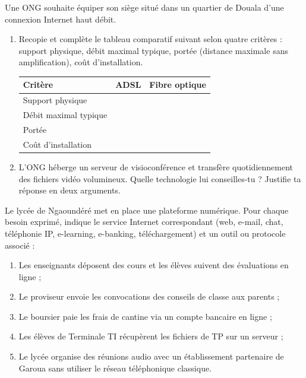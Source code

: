 \documentclass[11pt]{article}
\begin{document}
\begin{exercice}
Une ONG souhaite équiper son siège situé dans un quartier de Douala d'une connexion Internet haut débit.
\begin{enumerate}
    \item Recopie et complète le tableau comparatif suivant selon quatre critères : support physique, débit maximal typique, portée (distance maximale sans amplification), coût d'installation.
\begin{center}
\begin{tabularx}{\linewidth}{|l|X|X|}
\hline
\rowcolor{popblueL} \textbf{Critère} & \textbf{ADSL} & \textbf{Fibre optique} \\
\hline
Support physique & & \\
\hline
Débit maximal typique & & \\
\hline
Portée & & \\
\hline
Coût d'installation & & \\
\hline
\end{tabularx}
\end{center}
    \item L'ONG héberge un serveur de visioconférence et transfère quotidiennement des fichiers vidéo volumineux. Quelle technologie lui conseilles-tu ? Justifie ta réponse en deux arguments.
\end{enumerate}
\end{exercice}

\begin{exercice}
Le lycée de Ngaoundéré met en place une plateforme numérique. Pour chaque besoin exprimé, indique le service Internet correspondant (web, e-mail, chat, téléphonie IP, e-learning, e-banking, téléchargement) et un outil ou protocole associé :
\begin{enumerate}
    \item Les enseignants déposent des cours et les élèves suivent des évaluations en ligne ;
    \item Le proviseur envoie les convocations des conseils de classe aux parents ;
    \item Le boursier paie les frais de cantine via un compte bancaire en ligne ;
    \item Les élèves de Terminale TI récupèrent les fichiers de TP sur un serveur ;
    \item Le lycée organise des réunions audio avec un établissement partenaire de Garoua sans utiliser le réseau téléphonique classique.
\end{enumerate}
\end{exercice}
\end{document}
